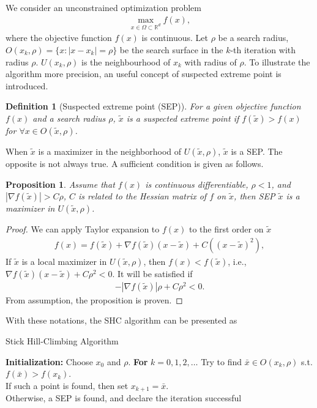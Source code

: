\documentclass[preprint,12pt]{elsarticle}
\newtheorem{definition}{Definition}
\newtheorem{proposition}{Proposition}
\begin{document}
We consider an unconstrained optimization problem 
\begin{align}
	\max_{x\in\Omega\subset\mathbb{R}^d} f(x),
	\label{}
\end{align}
where the objective function $f(x)$ is continuous.
Let $\rho$ be a search radius, $O(x_k, \rho)=\{x:
|x-x_k|=\rho\}$ be the search surface in the
$k$-th iteration with radius $\rho$. $U(x_k,
\rho)$ is the neighbourhood of $x_k$ with radius of $\rho$.
To illustrate the algorithm more precision, an useful concept of
suspected extreme point is introduced.
\begin{definition}[Suspected extreme point (SEP)]
	For a given objective function $f(x)$ and a search radius
	$\rho$, $\tilde{x}$ is a suspected extreme point if $f(\tilde
	x)>f(x)$ for $\forall x\in O(\tilde{x},\rho)$.
\end{definition}
When $\tilde{x}$ is a maximizer in the neighborhood of $U(\tilde{x}, \rho)$,
$\tilde{x}$ is a SEP. The opposite is not always true.
A sufficient condition is given as follows.
\begin{proposition}
	Assume that $f(x)$ is continuous differentiable, $\rho < 1$,
	and $|\nabla f(\tilde x)| > C\rho$, $C$ is related to the
	Hessian matrix of $f$ on $\tilde{x}$,
	then SEP $\tilde{x}$ is a maximizer in $U(\tilde{x}, \rho)$. 
\end{proposition}
\begin{proof}
	We can apply Taylor expansion to $f(x)$ to the first order on $\tilde x$
	\begin{align*}
		f(x)=f(\tilde x) + \nabla f(\tilde x)(x-\tilde{x}) + C( (x-\tilde{x} )^2),
	\end{align*}
	If $\tilde x$ is a local maximizer in $U(\tilde{x},\rho)$,
	then $f(x)<f(\tilde x)$, i.e., $\nabla f(\tilde
	x)(x-\tilde{x}) + C \rho^2<0$. It will be satisfied if 
	\begin{align*}
		-|\nabla f(\tilde x)|\rho + C\rho^2 < 0.
	\end{align*}
	From assumption, the proposition is proven.
\end{proof}


With these notations, the SHC algorithm can be presented as 
\begin{algorithm}[H]
	\caption{Stick Hill-Climbing Algorithm}
	\label{alg:SHC}
\begin{algorithmic}[1]
	\STATE \textbf{Initialization:} Choose $x_0$ and $\rho$.
	\STATE \textbf{For} $k=0,1,2,\dots$
	\STATE \hspace{0.5cm} Try to find $\bar{x}\in O(x_k, \rho)$
		   s.t. $f(\bar x)>f(x_k)$.
			\\
		 \hspace{0.5cm} If such a point is found, then set
		 $x_{k+1}= \bar{x}$.
		  \\
		   \hspace{0.5cm} Otherwise, a SEP is found, 
		   and declare the iteration successful 
\end{algorithmic}
\end{algorithm}
\end{document}
